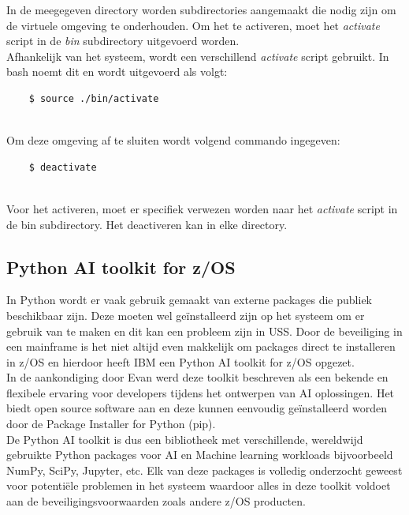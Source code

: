 In de meegegeven directory worden subdirectories aangemaakt die nodig zijn om de virtuele omgeving te onderhouden. Om het te activeren, moet het \textit{activate} script in de \textit{bin} subdirectory uitgevoerd worden. \autocite{PSF2024} \\
Afhankelijk van het systeem, wordt een verschillend \textit{activate} script gebruikt. In bash noemt dit  en wordt uitgevoerd als volgt:
\begin{lstlisting}
    $ source ./bin/activate
    
\end{lstlisting}

Om deze omgeving af te sluiten wordt volgend commando ingegeven:
\begin{lstlisting}
    $ deactivate
    
\end{lstlisting}

Voor het activeren, moet er specifiek verwezen worden naar het \textit{activate} script in de bin subdirectory. Het deactiveren kan in elke directory.

\subsection{Python AI toolkit for z/OS}
In Python wordt er vaak gebruik gemaakt van externe packages die publiek beschikbaar zijn. Deze moeten wel geïnstalleerd zijn op het systeem om er gebruik van te maken en dit kan een probleem zijn in USS. Door de beveiliging in een mainframe is het niet altijd even makkelijk om packages direct te installeren in z/OS \autocite{IBM2021} en hierdoor heeft IBM een Python AI toolkit for z/OS opgezet. \\

In de aankondiging door Evan \textcite{Rivera2023} werd deze toolkit beschreven als een bekende en flexibele ervaring voor developers tijdens het ontwerpen van AI oplossingen. Het biedt open source software aan en deze kunnen eenvoudig geïnstalleerd worden door de Package Installer for Python (pip). \\

De Python AI toolkit is dus een bibliotheek met verschillende, wereldwijd gebruikte Python packages voor AI en Machine learning workloads bijvoorbeeld NumPy, SciPy, Jupyter, etc. Elk van deze packages is volledig onderzocht geweest voor potentiële problemen in het systeem waardoor alles in deze toolkit voldoet aan de beveiligingsvoorwaarden zoals andere z/OS producten. \autocite{Bostian2023}


